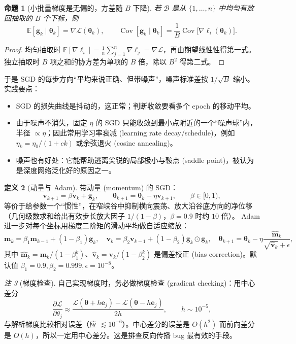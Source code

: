 \documentclass[UTF8,a4paper,11pt]{ctexart}
\theoremstyle{definition}
\newtheorem{definition}{定义}[section]
\theoremstyle{plain}
\newtheorem{proposition}[definition]{命题}
\theoremstyle{remark}
\newtheorem{remark}[definition]{注}
\DeclareMathOperator{\Cov}{Cov}
\newcommand{\E}{\mathbb{E}}
\newcommand{\Loss}{\mathcal{L}}
\newcommand{\eng}[1]{\textup{(#1)}}
\begin{document}
\begin{proposition}[小批量梯度是无偏的，方差随 $B$ 下降]\label{prop:sgd-unbiased}
若 $\mathcal{B}$ 是从 $\{1,\dots,n\}$ 中均匀有放回抽取的 $B$ 个下标，则
\[
  \E[\bm{g}_k\mid\bm{\theta}_k]=\nabla\Loss(\bm{\theta}_k),\qquad
  \Cov[\bm{g}_k\mid\bm{\theta}_k]=\frac1B\Cov\big[\nabla\ell_i(\bm{\theta}_k)\big].
\]
\end{proposition}

\begin{proof}
均匀抽取时 $\E[\nabla\ell_i]=\frac1n\sum_{j=1}^n\nabla\ell_j=\nabla\Loss$，再由期望线性性得第一式。独立抽取时 $B$ 项之和的协方差为单项的 $B$ 倍，除以 $B^2$ 得第二式。
\end{proof}

于是 SGD 的每步方向“平均来说正确、但带噪声”，噪声标准差按 $1/\sqrt{B}$ 缩小。实践要点：
\begin{itemize}
  \item SGD 的损失曲线是抖动的，这正常；判断收敛要看多个 epoch 的移动平均。
  \item 由于噪声不消失，固定 $\eta$ 的 SGD 只能收敛到最小点附近的一个“噪声球”内，半径 $\propto\eta$；因此常用学习率衰减 \eng{learning rate decay/schedule}，例如 $\eta_k=\eta_0/(1+ck)$ 或余弦退火 \eng{cosine annealing}。
  \item 噪声也有好处：它能帮助逃离尖锐的局部极小与鞍点 \eng{saddle point}，被认为是深度网络泛化好的原因之一。
\end{itemize}

\begin{definition}[动量与 Adam]\label{def:momentum}
带动量 \eng{momentum} 的 SGD：
\[
  \bm{v}_{k+1}=\beta\bm{v}_k+\bm{g}_k,\qquad \bm{\theta}_{k+1}=\bm{\theta}_k-\eta\bm{v}_{k+1},\qquad\beta\in[0,1),
\]
等价于给参数一个“惯性”，在窄峡谷中抑制横向震荡、放大沿谷底方向的净位移（几何级数求和给出有效步长放大因子 $1/(1-\beta)$，$\beta=0.9$ 时约 $10$ 倍）。
Adam 进一步对每个坐标用梯度二阶矩的滑动平均做自适应缩放：
\[
  \bm{m}_k=\beta_1\bm{m}_{k-1}+(1-\beta_1)\bm{g}_k,\quad
  \bm{v}_k=\beta_2\bm{v}_{k-1}+(1-\beta_2)\bm{g}_k\odot\bm{g}_k,\quad
  \bm{\theta}_{k+1}=\bm{\theta}_k-\eta\frac{\hat{\bm{m}}_k}{\sqrt{\hat{\bm{v}}_k}+\epsilon},
\]
其中 $\hat{\bm{m}}_k=\bm{m}_k/(1-\beta_1^k)$、$\hat{\bm{v}}_k=\bm{v}_k/(1-\beta_2^k)$ 是偏差校正 \eng{bias correction}。默认值 $\beta_1=0.9,\beta_2=0.999,\epsilon=10^{-8}$。
\end{definition}

\begin{remark}[梯度检查]
自己实现梯度时，务必做梯度检查 \eng{gradient checking}：用中心差分
\[
  \frac{\partial\Loss}{\partial\theta_j}\approx\frac{\Loss(\bm{\theta}+h\bm{e}_j)-\Loss(\bm{\theta}-h\bm{e}_j)}{2h},
  \qquad h\sim10^{-5},
\]
与解析梯度比较相对误差（应 $\lesssim10^{-6}$）。中心差分的误差是 $O(h^2)$ 而前向差分是 $O(h)$，所以一定用中心差分。这是排查反向传播 bug 最有效的手段。
\end{remark}
\end{document}
